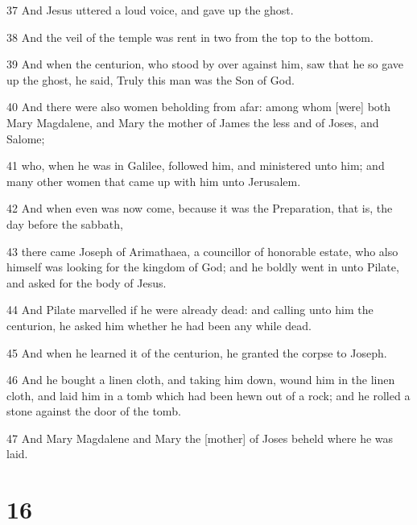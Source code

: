 \par 37 And Jesus uttered a loud voice, and gave up the ghost.
\par 38 And the veil of the temple was rent in two from the top to the bottom.
\par 39 And when the centurion, who stood by over against him, saw that he so gave up the ghost, he said, Truly this man was the Son of God.
\par 40 And there were also women beholding from afar: among whom [were] both Mary Magdalene, and Mary the mother of James the less and of Joses, and Salome;
\par 41 who, when he was in Galilee, followed him, and ministered unto him; and many other women that came up with him unto Jerusalem.
\par 42 And when even was now come, because it was the Preparation, that is, the day before the sabbath,
\par 43 there came Joseph of Arimathaea, a councillor of honorable estate, who also himself was looking for the kingdom of God; and he boldly went in unto Pilate, and asked for the body of Jesus.
\par 44 And Pilate marvelled if he were already dead: and calling unto him the centurion, he asked him whether he had been any while dead.
\par 45 And when he learned it of the centurion, he granted the corpse to Joseph.
\par 46 And he bought a linen cloth, and taking him down, wound him in the linen cloth, and laid him in a tomb which had been hewn out of a rock; and he rolled a stone against the door of the tomb.
\par 47 And Mary Magdalene and Mary the [mother] of Joses beheld where he was laid.

\chapter{16}

